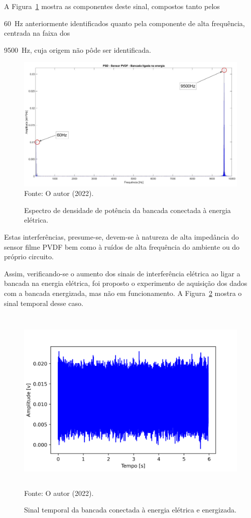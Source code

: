 \documentclass[
	12pt,				
	oneside,			
	a4paper,			
	english,			
	brazil,			
	]{abntex2ppgsi}
\begin{document}
{{A Figura~\ref{PSD_SENSOR_MAQUINA_LIGADA} mostra as componentes deste sinal, compostos tanto pelos {\SI{60}{\hertz} anteriormente identificados quanto pela componente de alta frequência, centrada na faixa dos {\SI{9500}{\hertz}, cuja origem não pôde ser identificada. 

\begin{figure}[H]
\centering
\caption {Espectro de densidade de potência da bancada conectada à energia elétrica.}
\includegraphics[width=170mm,keepaspectratio]{PSD_PVDF_MAQUINA_LIGADA} \\
Fonte: O autor (2022).
\label{PSD_SENSOR_MAQUINA_LIGADA}
\end{figure} 

Estas interferências, presume-se, devem-se à natureza de alta impedância do sensor filme PVDF bem como à ruídos de alta frequência do ambiente ou do próprio circuito.  

Assim, verificando-se o aumento dos sinais de interferência elétrica ao ligar a bancada na energia elétrica, foi proposto o experimento de aquisição dos dados com a bancada energizada, mas não em funcionamento. A Figura~\ref{maquina_ligada_na_tomada_e_energizada} mostra o sinal temporal desse caso.

\begin{figure}[H]
\centering
\caption {Sinal temporal da bancada conectada à energia elétrica e energizada.}
\includegraphics[width=\textwidth,height=90mm,keepaspectratio]{aquisicao_03_maquina_energizada_10_03_2022_08h57min_ajustado_6s} \\
Fonte: O autor (2022).
\label{maquina_ligada_na_tomada_e_energizada}
\end{figure} 

}}}}
\end{document}
